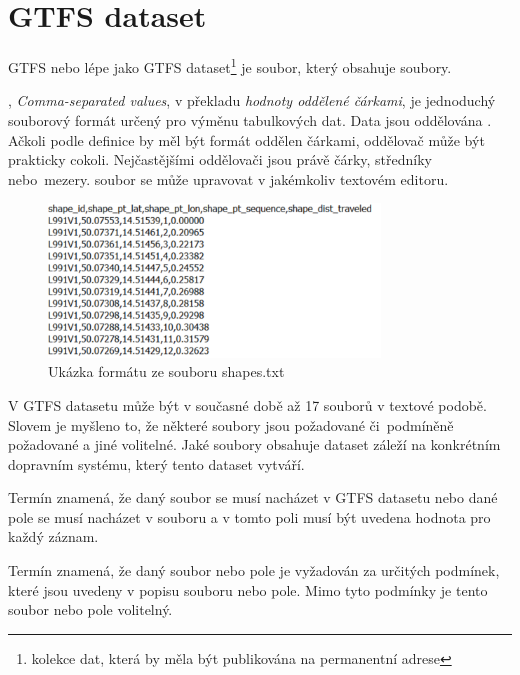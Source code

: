 
\section{GTFS dataset}
GTFS  nebo lépe jako GTFS dataset\footnote{kolekce dat, která by měla být publikována na permanentní  adrese}
je  soubor, který obsahuje  soubory.

, \textit{Comma-separated values}, v překladu \textit{hodnoty oddělené čárkami}, je jednodu\-chý 
souborový formát určený pro výměnu tabulkových dat. Data jsou oddělována .
Ačkoli podle definice by měl být formát oddělen čárkami, oddělovač může být prakticky cokoli. 
Nejčastějšími oddělovači jsou právě čárky, středníky nebo~mezery.  soubor se 
může upravovat v jakémkoliv textovém editoru.

\begin{figure}[H] \centering
    \includegraphics[width=250pt]{./pictures/ukazka-csv.PNG}
    \caption[Ukázka  formátu ze souboru shapes.txt]{Ukázka  formátu ze souboru shapes.txt}
	\label{fig:ukazka-csv}              
\end{figure}

V GTFS datasetu může být v současné době až 17  souborů v textové podobě. Slovem  je myšleno to,
že některé  soubory jsou požadované či~podmíněně požadované a jiné volitelné.
Jaké  soubory obsahuje dataset záleží na konkrétním dopravním systému, který
tento dataset vytváří.

Termín  znamená, že daný  soubor se musí nacházet v GTFS datasetu nebo dané pole
se musí nacházet v  souboru a v tomto poli musí být uvedena hodnota pro každý záznam. 

Termín  znamená, že daný  soubor nebo pole je vyžadován za určitých podmínek, 
které jsou uvedeny v popisu souboru nebo pole. Mimo tyto podmínky je tento soubor nebo pole volitelný.

